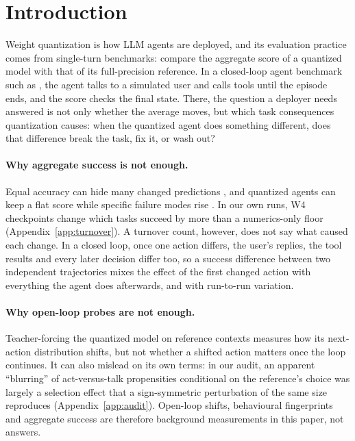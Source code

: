 \section{Introduction}
\label{sec:intro}

Weight quantization is how LLM agents are deployed, and its evaluation practice comes from single-turn benchmarks: compare the aggregate score of a quantized model with that of its full-precision reference. In a closed-loop agent benchmark such as \tautwo{} \citep{barres2025tau2}, the agent talks to a simulated user and calls tools until the episode ends, and the score checks the final state. There, the question a deployer needs answered is not only whether the average moves, but which task consequences quantization causes: when the quantized agent does something different, does that difference break the task, fix it, or wash out?

\paragraph{Why aggregate success is not enough.} Equal accuracy can hide many changed predictions \citep{dutta2024accuracy}, and quantized \tautwo{} agents can keep a flat score while specific failure modes rise \citep{jang2026flat}. In our own runs, W4 checkpoints change which tasks succeed by more than a numerics-only floor (Appendix~\ref{app:turnover}). A turnover count, however, does not say what caused each change. In a closed loop, once one action differs, the user's replies, the tool results and every later decision differ too, so a success difference between two independent trajectories mixes the effect of the first changed action with everything the agent does afterwards, and with run-to-run variation.

\paragraph{Why open-loop probes are not enough.} Teacher-forcing the quantized model on reference contexts measures how its next-action distribution shifts, but not whether a shifted action matters once the loop continues. It can also mislead on its own terms: in our audit, an apparent ``blurring'' of act-versus-talk propensities conditional on the reference's choice was largely a selection effect that a sign-symmetric perturbation of the same size reproduces (Appendix~\ref{app:audit}). Open-loop shifts, behavioural fingerprints and aggregate success are therefore background measurements in this paper, not answers.

